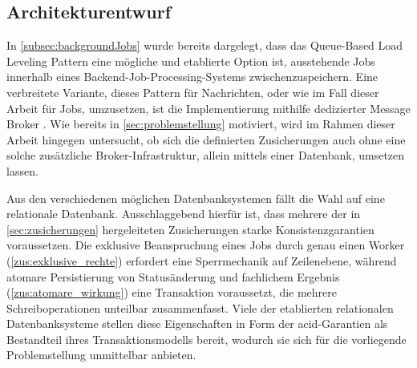 \subsection{Architekturentwurf}
\label{subsec:architekturentwurf}
In \cref{subsec:backgroundJobs} wurde bereits dargelegt, dass das Queue-Based Load Leveling Pattern eine mögliche und etablierte
Option ist, ausstehende Jobs innerhalb eines Backend-Job-Processing-Systems zwischenzuspeichern.
Eine verbreitete Variante, dieses Pattern für Nachrichten, oder wie im Fall dieser Arbeit für Jobs, umzusetzen,
ist die Implementierung mithilfe dedizierter Message Broker \parencite[Kap.~11 Abschnitt \glqq Message brokers\grqq]{kleppmann_designing_2017}.
Wie bereits in \cref{sec:problemstellung} motiviert, wird im Rahmen dieser Arbeit hingegen untersucht, ob sich die definierten
Zusicherungen auch ohne eine solche zusätzliche Broker-Infrastruktur, allein mittels einer Datenbank, umsetzen lassen.

Aus den verschiedenen möglichen Datenbanksystemen fällt die Wahl auf eine relationale Datenbank.
Ausschlaggebend hierfür ist, dass mehrere der in \cref{sec:zusicherungen} hergeleiteten Zusicherungen starke Konsistenzgarantien voraussetzen.
Die exklusive Beanspruchung eines Jobs durch genau einen Worker (\ref{zus:exklusive_rechte}) erfordert eine Sperrmechanik auf Zeilenebene,
während atomare Persistierung von Statusänderung und fachlichem Ergebnis (\ref{zus:atomare_wirkung}) eine Transaktion voraussetzt,
die mehrere Schreiboperationen unteilbar zusammenfasst.
Viele der etablierten relationalen Datenbanksysteme stellen diese Eigenschaften in Form der \gls{acid}-Garantien als Bestandteil
ihres Transaktionsmodells bereit, wodurch sie sich für die vorliegende Problemstellung unmittelbar anbieten.

